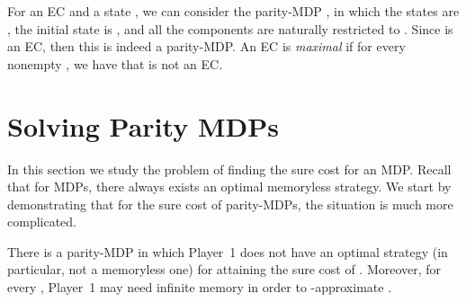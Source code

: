 \documentclass[runningheads,a4paper]{llncs}
\newcommand{\stam}[1]{}
\begin{document}
For an EC  and a state , we can consider the parity-MDP , in which the states are , the initial state is , and all the components are naturally restricted to . Since  is an EC, then this is indeed a parity-MDP. An EC  is {\em maximal\/} if for every nonempty  
, we have that  is not an EC.

\stam{
Consider a set . A {\em environment attractor} for , denoted  is defined inductively as follows. First, . Now, for every , let . Then, . It is well known that  can be computed in time polynomial in the description of . We analogously define the {\em system attractor} , by swapping the roles of Players  and .
}

\section{Solving Parity MDPs}
\label{sec: solving}
In this section we study the problem of finding the sure cost for an MDP. Recall that for MDPs, there always exists an optimal memoryless strategy. We start by demonstrating that for the sure cost of parity-MDPs, the situation is much more complicated.
\begin{theorem}
\label{no opt}
There is a parity-MDP  in which Player~1 does not have an optimal strategy (in particular, not a memoryless one) for attaining the sure cost of . Moreover, 
for every ,
Player~1 
may need
infinite memory in order to 
-approximate .
\end{theorem}
\end{document}
